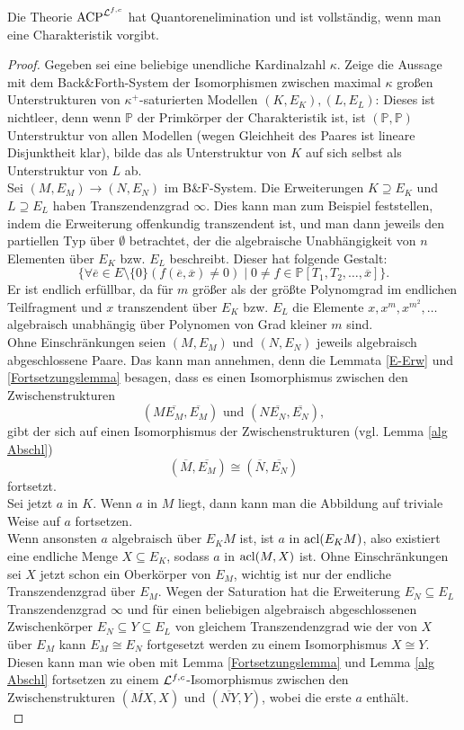     \begin{theorem}\label{QE}
    	Die Theorie $\operatorname{ACP}^{\mathcal{L}^{f,c}}$ hat Quantorenelimination und ist vollständig, wenn man eine Charakteristik vorgibt.
    \end{theorem}
    \begin{proof}
    	Gegeben sei eine beliebige unendliche Kardinalzahl $\kappa$.
    	Zeige die Aussage mit dem Back\&Forth-System der Isomorphismen zwischen maximal $\kappa$ großen Unterstrukturen von $\kappa^+$-saturierten Modellen $(K,E_K),(L,E_L)$:
    	Dieses ist nichtleer, denn wenn $\mathbb{P}$ der Primkörper der Charakteristik ist, ist $(\mathbb{P},\mathbb{P})$ Unterstruktur von allen Modellen (wegen Gleichheit des Paares ist lineare Disjunktheit klar), bilde das als Unterstruktur von $K$ auf sich selbst als Unterstruktur von $L$ ab.\\
    	Sei $(M,E_M)\rightarrow(N,E_N)$ im B\&F-System. Die Erweiterungen $K\supseteq E_K$ und $L\supseteq E_L$ haben Transzendenzgrad $\infty$. Dies kann man zum Beispiel feststellen, indem die Erweiterung offenkundig transzendent ist, und man dann jeweils den partiellen Typ über $\emptyset$ betrachtet, der die algebraische Unabhängigkeit von $n$ Elementen über $E_K$ bzw. $E_L$ beschreibt. Dieser hat folgende Gestalt:
    	$$\{\forall \overline{e}\in E\setminus\{0\}(f(\overline{e},\overline{x})\neq0)\mid 0\neq f\in\mathbb{P}[T_1,T_2,\dots,\overline{x}]\}.$$
    	Er ist endlich erfüllbar, da für $m$ größer als der größte Polynomgrad im endlichen Teilfragment und $x$ transzendent über $E_K$ bzw. $E_L$ die Elemente $x,x^m,x^{m^2},\dots$ algebraisch unabhängig über Polynomen von Grad kleiner $m$ sind.\\
    	Ohne Einschränkungen seien $(M,E_M)$ und $(N,E_N)$ jeweils algebraisch abgeschlossene Paare. Das kann man annehmen, denn die Lemmata \ref{E-Erw} und \ref{Fortsetzungslemma} besagen, dass es einen Isomorphismus zwischen den Zwischenstrukturen $$(M\overline{E_M},\overline{E_M})\text{ und }(N\overline{E_N},\overline{E_N}),$$ gibt der sich auf einen Isomorphismus der Zwischenstrukturen (vgl. Lemma \ref{alg Abschl}) $$(\overline{M},\overline{E_M})\cong(\overline{N},\overline{E_N})$$ fortsetzt.\\
    	Sei jetzt $a$ in $K$. Wenn $a$ in $M$ liegt, dann kann man die Abbildung auf triviale Weise auf $a$ fortsetzen.\\
    	Wenn ansonsten $a$ algebraisch über $E_KM$ ist, ist $a$ in $\operatorname{acl}(E_KM)$, also existiert eine endliche Menge $X\subseteq E_K$, sodass $a$ in $\operatorname{acl}(M,X)$ ist. Ohne Einschränkungen sei $X$ jetzt schon ein Oberkörper von $E_M$, wichtig ist nur der endliche Transzendenzgrad über $E_M$. Wegen der Saturation hat die Erweiterung $E_N\subseteq E_L$ Transzendenzgrad $\infty$ und für einen beliebigen algebraisch abgeschlossenen Zwischenkörper $E_N\subseteq Y\subseteq E_L$ von gleichem Transzendenzgrad wie der von $X$ über $E_M$ kann $E_M\cong E_N$ fortgesetzt werden zu einem Isomorphismus $X\cong Y$. Diesen kann man wie oben mit Lemma \ref{Fortsetzungslemma} und Lemma \ref{alg Abschl} fortsetzen zu einem $\mathcal{L}^{f,c}$-Isomorphismus zwischen den Zwischenstrukturen $(\overline{MX},X)$ und $(\overline{NY},Y)$, wobei die erste $a$ enthält.\\

\end{proof}
